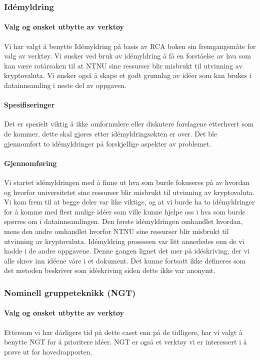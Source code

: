 \subsubsection{Idémyldring}
\paragraph{Valg og ønsket utbytte av verktøy}
Vi har valgt å benytte Idémyldring på basis av RCA boken \cite{RCA} sin fremgangsmåte for valg av verktøy. 
Vi ønsker ved bruk av idémyldring å få en forståelse av hva som kan være rotårsaken til at NTNU sine ressurser blir misbrukt til utvinning av kryptovaluta. Vi ønsker også å skape et godt grunnlag av idéer som kan brukes i datainnsamling i neste del av oppgaven.

\paragraph{Spesifiseringer}
Det er spesielt viktig å ikke omformulere eller diskutere forslagene etterhvert som de kommer, dette skal gjøres etter idémyldringsøkten er over. Det ble gjennomført to idémyldringer på forskjellige aspekter av problemet. 

\paragraph{Gjennomføring}
Vi startet idémyldringen med å finne ut hva som burde fokuseres på av hvordan og hvorfor universitetet sine ressurser blir misbrukt til utvinning av kryptovaluta. Vi kom frem til at begge deler var like viktige, og at vi burde ha to idémyldringer for å komme med flest mulige idéer som ville kunne hjelpe oss i hva som burde spørres om i datainnsamlingen. Den første idémyldringen omhandlet hvordan, mens den andre omhandlet hvorfor NTNU sine ressurser blir misbrukt til utvinning av kryptovaluta. Idémyldring prosessen var litt annerledes enn de vi hadde i de andre oppgavene. Denne gangen lignet det mer på idéskriving, der vi alle skrev inn idéene våre i et dokument. Det kunne fortsatt ikke defineres som det metoden beskriver som idéskriving siden dette ikke var anonymt.


\subsubsection{Nominell gruppeteknikk (NGT)}
\paragraph{Valg og ønsket utbytte av verktøy}
Ettersom vi har dårligere tid på dette caset enn på de tidligere, har vi valgt å benytte NGT for å prioritere idéer. NGT er også et verktøy vi er interessert i å prøve ut for hovedrapporten.

